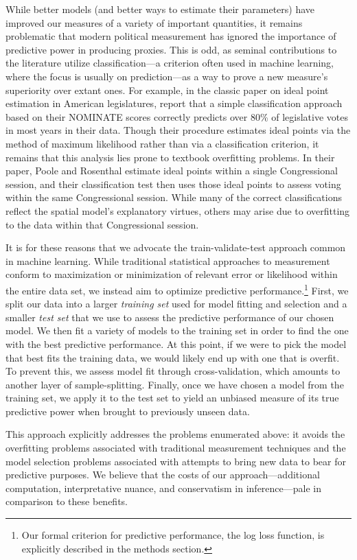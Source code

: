 While better models (and better ways to estimate their parameters) have improved our measures of a variety of important quantities, it remains problematic that modern political measurement has ignored the importance of predictive power in producing proxies.
This is odd, as seminal contributions to the literature utilize classification---a criterion often used in machine learning, where the focus is usually on prediction---as a way to prove a new measure's superiority over extant ones. For example, in the classic paper on ideal point estimation in American legislatures, \citet[Table 3]{poole1985} report that a simple classification approach based on their NOMINATE scores correctly predicts over 80\% of legislative votes in most years in their data. Though their procedure estimates ideal points via the method of maximum likelihood rather than via a classification criterion, it remains that this analysis lies prone to textbook overfitting problems.
In their paper, Poole and Rosenthal estimate ideal points within a single Congressional session, and their classification test then uses those ideal points to assess voting within the same Congressional session.
While many of the correct classifications reflect the spatial model's explanatory virtues, others may arise due to overfitting to the data within that Congressional session.

It is for these reasons that we advocate the train-validate-test approach common in machine learning.
While traditional statistical approaches to measurement conform to maximization or minimization of relevant error or likelihood within the entire data set, we instead aim to optimize predictive performance.\footnote{Our formal criterion for predictive performance, the log loss function, is explicitly described in the methods section.}
First, we split our data into a larger \emph{training set} used for model fitting and selection and a smaller \emph{test set} that we use to assess the predictive performance of our chosen model.
We then fit a variety of models to the training set in order to find the one with the best predictive performance.
At this point, if we were to pick the model that best fits the training data, we would likely end up with one that is overfit.
To prevent this, we assess model fit through cross-validation, which amounts to another layer of sample-splitting.
Finally, once we have chosen a model from the training set, we apply it to the test set to yield an unbiased measure of its true predictive power when brought to previously unseen data.

This approach explicitly addresses the problems enumerated above: it avoids the overfitting problems associated with traditional measurement techniques and the model selection problems associated with attempts to bring new data to bear for predictive purposes.
We believe that the costs of our approach---additional computation, interpretative nuance, and conservatism in inference---pale in comparison to these benefits.

